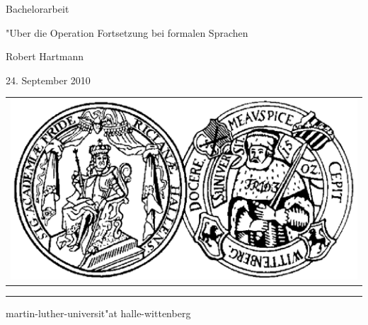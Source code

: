 \pagestyle{empty}

\begin{center}

{\Large\sc Bachelorarbeit}

\vspace{1.25cm}

{\fontsize{22}{22}\selectfont "Uber die Operation Fortsetzung bei formalen Sprachen}

\vspace{1.25cm}

{\Large\sc

Robert Hartmann

\vspace{.15cm}

24. September 2010

}

\vspace{10.5cm}

\begin{tabular}{c}
	\includegraphics[height=15ex]{Bilder/siegel}
\end{tabular}

\vspace{0.5cm}

\rule{.7\textwidth}{.40pt}

\vspace{.2cm}

{\large\sc

martin-luther-universit"at halle-wittenberg

}

\end{center}

\cleardoublepage

